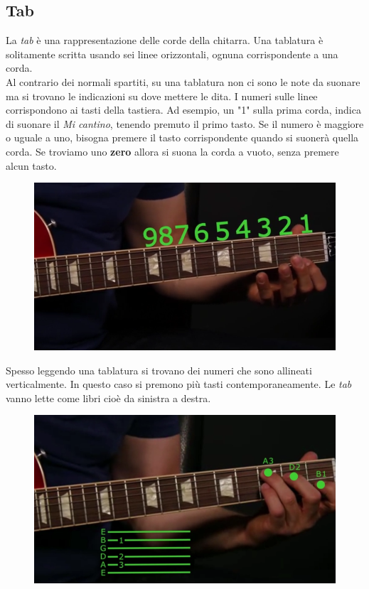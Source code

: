 \subsection{Tab}
La \textit{tab} è una rappresentazione delle corde della chitarra. Una tablatura è solitamente scritta usando sei linee orizzontali, ognuna corrispondente a una corda.\\
Al contrario dei normali spartiti, su una tablatura non ci sono le note da suonare ma si trovano le indicazioni su dove mettere le dita. I numeri sulle linee corrispondono ai tasti della tastiera. Ad esempio, un "1" sulla prima corda, indica di suonare il \textit{Mi cantino}, tenendo premuto il primo tasto.
Se il numero è maggiore o uguale a uno, bisogna premere il tasto corrispondente quando si suonerà quella corda. Se troviamo uno \textbf{zero} allora si suona la corda a vuoto, senza premere alcun tasto.
\begin{figure}[H]
	\centering
	\includegraphics[scale=0.50]{./images/img15.png}
\end{figure}

Spesso leggendo una tablatura si trovano dei numeri che sono allineati verticalmente. In questo caso si premono più tasti contemporaneamente. Le \textit{tab} vanno lette come libri cioè da sinistra a destra.
\begin{figure}[H]
	\centering
	\includegraphics[scale=0.50]{./images/img16.png}
\end{figure}